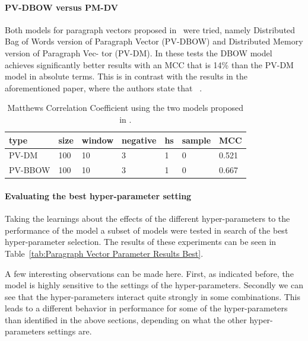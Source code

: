 \paragraph{PV-DBOW versus PM-DV}
Both models for paragraph vectors proposed in~\cite{Le:2014aa} were tried, namely Distributed Bag of Words version of Paragraph Vector (PV-DBOW) and Distributed Memory version of Paragraph Vec- tor (PV-DM). In these tests the DBOW model achieves significantly better results with an MCC that is 14\% than the PV-DM model in absolute terms. This is in contrast with the results in the aforementioned paper, where the authors state that ~\cite{Le:2014aa}.

\begin{table}[h]
  \begin{center}
  \begin{tabular}{ *6l | l }
    \toprule
    type & size & window & negative & hs & sample & MCC  \\
    \midrule
    PV-DM & 100 & 10 & 3 & 1 & 0 & 0.521 \\
    PV-BBOW & 100 & 10 & 3 & 1 & 0 & 0.667 \\
    \bottomrule
  \end{tabular}
  \caption{Matthews Correlation Coefficient using the two models proposed in \cite{Le:2014aa}.}
\label{tab:Paragraph Vector Parameter Results Hierarchical Softmax}
\end{center}
\end{table}

\paragraph{Evaluating the best hyper-parameter setting}

Taking the learnings about the effects of the different hyper-parameters to the performance of the model a subset of models were tested in search of the best hyper-parameter selection. The results of these experiments can be seen in Table~\ref{tab:Paragraph Vector Parameter Results Best}.

A few interesting observations can be made here. First, as indicated before, the model is highly sensitive to the settings of the hyper-parameters. Secondly we can see that the hyper-parameters interact quite strongly in some combinations. This leads to a different behavior in performance for some of the hyper-parameters than identified in the above sections, depending on what the other hyper-parameters settings are.

